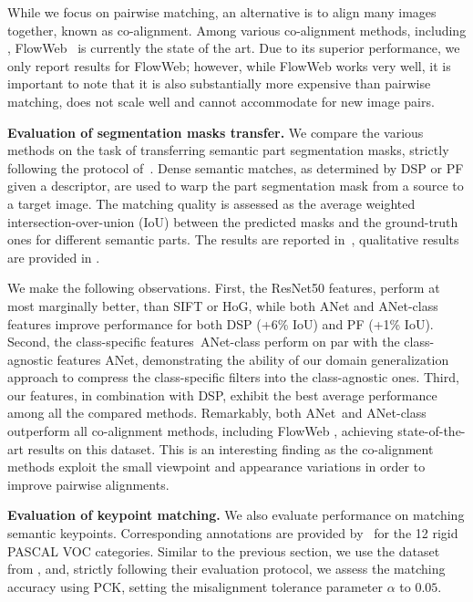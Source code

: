 \documentclass[10pt,twocolumn,letterpaper]{article}
\def\methodname{ANet\xspace}
\newcommand{\myparagraph}[1]{\vspace{0.15cm}\noindent\textbf{#1.}}
\begin{document}
While we focus on pairwise matching, an alternative is to align many images together, known as co-alignment. Among various co-alignment methods, including \cite{huang07unsupervised,peng2010rasl,kemelmacher2012collection}, FlowWeb~\cite{zhou15flowweb} is currently the state of the art. Due to its superior performance, we only report results for FlowWeb; however, while FlowWeb works very well, it is important to note that it is also substantially more expensive than pairwise matching, does not scale well and cannot accommodate for new image pairs. 

\myparagraph{Evaluation of segmentation masks transfer} We compare the various methods on the task of transferring semantic part segmentation masks, strictly following the protocol of~\cite{zhou15flowweb}. Dense semantic matches, as determined by DSP or PF given a descriptor, are used to warp the part segmentation mask from a source to a target image. The matching quality is assessed as the average weighted intersection-over-union (IoU) between the predicted masks and the ground-truth ones for different semantic parts. 
The results are reported in~, qualitative results are provided in .

We make the following observations. 
First, the ResNet50 features, perform at most marginally better, than SIFT or HoG, while both \methodname and \methodname-class features
improve performance for both DSP (+6\% IoU) and PF (+1\% IoU). %
Second, the class-specific features~\methodname-class perform on par with the class-agnostic features \methodname, 
demonstrating the ability of our domain generalization approach to compress the class-specific filters into the class-agnostic ones.
Third, our features, in combination with DSP, exhibit the best average performance among all the compared methods. Remarkably, both \methodname~and \methodname-class outperform all co-alignment methods, including FlowWeb \cite{zhou15flowweb}, achieving state-of-the-art results on this dataset. This is an interesting finding as the co-alignment methods exploit the small viewpoint and appearance variations in order to improve pairwise alignments.

\myparagraph{Evaluation of keypoint matching}
We also evaluate performance on matching semantic keypoints. Corresponding annotations are provided by~\cite{xiang2014beyond} for the 12 rigid PASCAL VOC categories. Similar to the previous section, we use the dataset from \cite{zhou15flowweb}, and, strictly following their evaluation protocol, we assess the matching accuracy using PCK, setting the misalignment tolerance parameter $\alpha$ to $0.05$.
\end{document}
